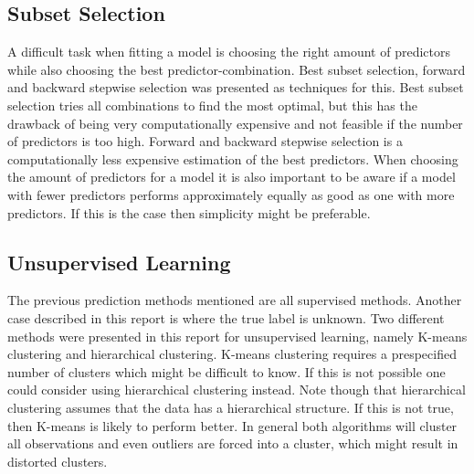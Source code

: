 \subsection{Subset Selection}
A difficult task when fitting a model is choosing the right amount of predictors while also choosing the best predictor-combination. Best subset selection, forward and backward stepwise selection was presented as techniques for this. Best subset selection tries all combinations to find the most optimal, but this has the drawback of being very computationally expensive and not feasible if the number of predictors is too high. Forward and backward stepwise selection is a computationally less expensive estimation of the best predictors. When choosing the amount of predictors for a model it is also important to be aware if a model with fewer predictors performs approximately equally as good as one with more predictors. If this is the case then simplicity might be preferable.

\subsection{Unsupervised Learning}
The previous prediction methods mentioned are all supervised methods. Another case described in this report is where the true label is unknown. Two different methods were presented in this report for unsupervised learning, namely K-means clustering and hierarchical clustering. K-means clustering requires a prespecified  number of clusters which might be difficult to know. If this is not possible one could consider using hierarchical clustering instead. Note though that hierarchical clustering assumes that the data has a hierarchical structure. If this is not true, then K-means is likely to perform better. In general both algorithms will cluster all observations and even outliers are forced into a cluster, which might result in distorted clusters.